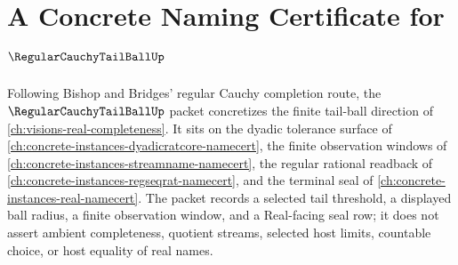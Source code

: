\chapter{A Concrete Naming Certificate for $\RegularCauchyTailBallUp$}
\label{ch:concrete-instances-regular-cauchy-tail-ball-namecert}

Following Bishop and Bridges' regular Cauchy completion route, the $\RegularCauchyTailBallUp$ packet concretizes the finite tail-ball direction of \autoref{ch:visions-real-completeness}. It sits on the dyadic tolerance surface of \autoref{ch:concrete-instances-dyadicratcore-namecert}, the finite observation windows of \autoref{ch:concrete-instances-streamname-namecert}, the regular rational readback of \autoref{ch:concrete-instances-regseqrat-namecert}, and the terminal seal of \autoref{ch:concrete-instances-real-namecert}. The packet records a selected tail threshold, a displayed ball radius, a finite observation window, and a Real-facing seal row; it does not assert ambient completeness, quotient streams, selected host limits, countable choice, or host equality of real names.

